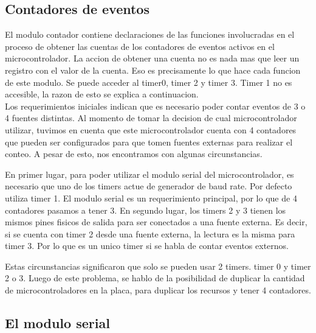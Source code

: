 

\subsection{Contadores de eventos} %
\label{it2:sub:contadores_de_eventos}


El modulo contador contiene declaraciones de las funciones involucradas en el proceso de obtener las cuentas de los contadores de eventos activos en el microcontrolador. La accion de obtener una cuenta no es nada mas que leer un registro con el valor de la cuenta. Eso es precisamente lo que hace cada funcion de este modulo. Se puede acceder al timer0, timer 2 y timer 3. Timer 1 no es accesible, la razon de esto se explica a continuacion. \\

Los requerimientos iniciales indican que es necesario poder contar eventos de 3 o 4 fuentes distintas. Al momento de tomar la decision de cual microcontrolador utilizar, tuvimos en cuenta que este microcontrolador cuenta con 4 contadores que pueden ser configurados para que tomen fuentes externas para realizar el conteo. A pesar de esto, nos encontramos con algunas circunstancias. 

En primer lugar, para poder utilizar el modulo serial del microcontrolador, es necesario que uno de los timers actue de generador de baud rate. Por defecto utiliza timer 1. El modulo serial es un requerimiento principal, por lo que de 4 contadores pasamos a tener 3. En segundo lugar, los timers 2 y 3 tienen los mismos pines fisicos de salida para ser conectados a una fuente externa. Es decir, si se cuenta con timer 2 desde una fuente externa, la lectura es la misma para timer 3. Por lo que es un unico timer si se habla de contar eventos externos.

Estas circunstancias significaron que solo se pueden usar 2 timers. timer 0 y timer 2 o 3. Luego de este problema, se hablo de la posibilidad de duplicar la cantidad de microcontroladores en la placa, para duplicar los recursos y tener 4 contadores.


\subsection{El modulo serial} %
\label{it2:sub:el_modulo_serial}

